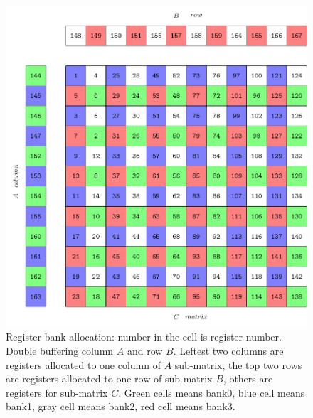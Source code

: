 \documentclass{sig-alternate-05-2015}
\begin{document}
\begin{figure}[htbp]
\begin{center}
\includegraphics[scale=0.55]{reg}
\caption{Register bank allocation: number in the cell is register number. Double buffering column
    $A$ and row $B$. Leftest two columns are registers allocated to one column of $A$ sub-matrix, the
top two rows are registers allocated to one row of sub-matrix $B$, others are registers for
sub-matrix $C$. Green cells means bank0, blue cell means bank1, gray cell means bank2, red cell
means bank3.}
\label{fig:reg}
\end{center}
\end{figure}
\end{document}
